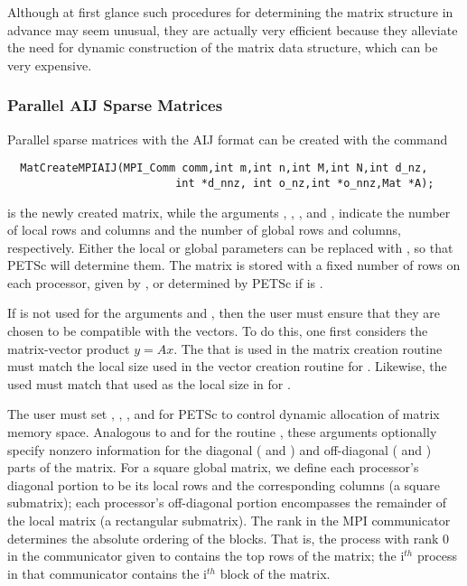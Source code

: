 Although at first glance such procedures for determining the matrix
structure in advance may seem unusual, they are actually very
efficient because they alleviate the need for dynamic
construction of the matrix data structure, which can be very
expensive.


\subsubsection{Parallel AIJ Sparse Matrices}

Parallel sparse matrices with the AIJ 
format can be created with the command 
\begin{verbatim}
  MatCreateMPIAIJ(MPI_Comm comm,int m,int n,int M,int N,int d_nz,
                          int *d_nnz, int o_nz,int *o_nnz,Mat *A);
\end{verbatim}
 is the newly created matrix, while the arguments , , 
, and , indicate the number of local rows and columns and
the number of global rows and columns, respectively. Either the local or
global parameters can be replaced with , so that 
PETSc will determine  them.
The matrix is stored with a fixed number of rows on 
each processor, given by , or determined by PETSc if  is
.

If  is not used for the arguments
 and , then the user must ensure that they are chosen to be
compatible with the vectors. To do this, one first considers the matrix-vector product 
$y = A x$. The  that is used in the matrix creation routine 
must match the local size used in the vector creation routine  for .
Likewise, the  used must match that used as the local size in 
 for . 

The user must set , , , and 
 for PETSc to control dynamic allocation of matrix
memory space.  Analogous to  and  for the routine 
, these arguments optionally specify 
nonzero information for the diagonal ( and ) and 
off-diagonal ( and ) parts of the matrix. 
For a square global matrix, we define each processor's diagonal portion 
to be its local rows and the corresponding columns (a square submatrix);  
each processor's off-diagonal portion encompasses the remainder of the
local matrix (a rectangular submatrix).  
The rank in the MPI communicator determines the absolute ordering of the
blocks.  That is, the process with rank 0 in the communicator given to  contains the top rows of the matrix; the i$^{th}$ process
in that communicator contains the i$^{th}$ block of the matrix.

